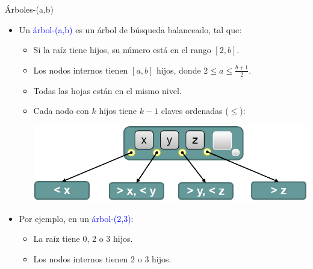 \documentclass[handout]{beamer} %
\newcommand{\blue}[1]{\textcolor{blue}{#1}}
\begin{document}
\begin{frame}{Árboles-(a,b)}
    \begin{itemize}
        \item<1-> Un \blue{árbol-(a,b)} es un árbol de búsqueda balanceado, tal que:
        \begin{itemize}
            \item Si la raíz tiene hijos, su número está en el rango $[2,b]$.
            \item Los nodos internos tienen $[a,b]$ hijos, donde $2\leq a\leq \frac{b+1}{2}$.
            \item Todas las hojas están en el mismo nivel.
            \item Cada nodo con $k$ hijos tiene $k-1$ claves ordenadas ($\leq$):
            \begin{center}
            \includegraphics[width=.6\textwidth]{./image/cap3/(ab)-tree}
            \end{center}
        \end{itemize}
        \item<2-> Por ejemplo, en un \blue{árbol-(2,3)}:
        \begin{itemize}
            \item La raíz tiene 0, 2 o 3 hijos.
            \item Los nodos internos tienen 2 o 3 hijos.
        \end{itemize}
    \end{itemize}
\end{frame}
\end{document}
